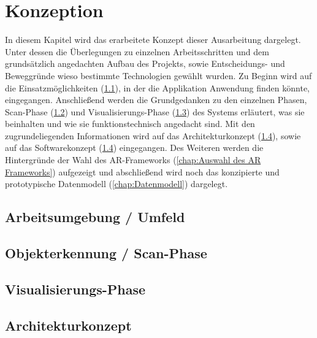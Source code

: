 
\chapter{Konzeption}
\label{chap:Konzeption}
In diesem Kapitel wird das erarbeitete Konzept dieser Ausarbeitung dargelegt. Unter dessen die Überlegungen zu einzelnen 
Arbeitsschritten und dem grundsätzlich angedachten Aufbau des Projekts, sowie Entscheidungs- und Beweggründe wieso bestimmte 
Technologien gewählt wurden. Zu Beginn wird auf die Einsatzmöglichkeiten (\ref{chap:Arbeitsumgebung}), in der die Applikation Anwendung 
finden könnte, eingegangen. Anschließend werden die Grundgedanken zu den einzelnen Phasen, Scan-Phase (\ref{chap:Scan-Phase}) und 
Visualisierungs-Phase (\ref{chap:Visualisierungs-Phase}) des Systems erläutert, was sie beinhalten und wie sie funktionstechnisch 
angedacht sind. Mit den zugrundeliegenden Informationen wird auf das Architekturkonzept (\ref{chap:Architekturkonzept}), sowie auf das 
Softwarekonzept (\ref{chap:Architekturkonzept}) eingegangen. Des Weiteren werden die Hintergründe der Wahl des AR-Frameworks 
(\ref{chap:Auswahl des AR Frameworks}) aufgezeigt und abschließend wird noch das konzipierte und prototypische Datenmodell 
(\ref{chap:Datenmodell}) dargelegt.

\section{Arbeitsumgebung / Umfeld}
\label{chap:Arbeitsumgebung}

\section{Objekterkennung / Scan-Phase}
\label{chap:Scan-Phase}

\section{Visualisierungs-Phase}
\label{chap:Visualisierungs-Phase}

\section{Architekturkonzept}
\label{chap:Architekturkonzept}


